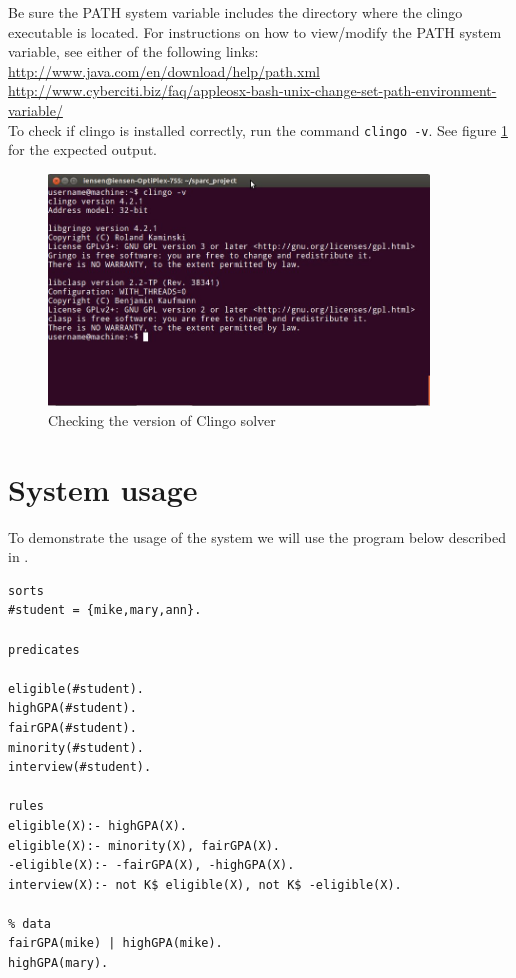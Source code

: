 \documentclass[12pt, letterpaper]{article}
\begin{document}
Be sure the PATH system variable includes the directory where the clingo executable is located. For instructions on how to view/modify the PATH system variable, see either of the following links:\\
{\scriptsize
\url{http://www.java.com/en/download/help/path.xml}\\
\url{http://www.cyberciti.biz/faq/appleosx-bash-unix-change-set-path-environment-variable/}\\
}
To check if clingo is installed correctly, run the command  \texttt{clingo -v}. See figure \ref{fig:clingo_solver_check} for the expected output.

\begin{figure}[h!]
\centering
\includegraphics[width=0.9\textwidth]{clingo_version.jpg}
\caption{Checking the version of Clingo solver}
\label{fig:clingo_solver_check}
\end{figure}

\section{System usage}

To demonstrate the usage of the system we will use the program  below described in \cite{epist}.
\begin{verbatim}
sorts
#student = {mike,mary,ann}.

predicates

eligible(#student).
highGPA(#student).
fairGPA(#student).
minority(#student).
interview(#student).

rules
eligible(X):- highGPA(X).
eligible(X):- minority(X), fairGPA(X).
-eligible(X):- -fairGPA(X), -highGPA(X).
interview(X):- not K$ eligible(X), not K$ -eligible(X).

% data
fairGPA(mike) | highGPA(mike).
highGPA(mary).
\end{verbatim}
\end{document}
